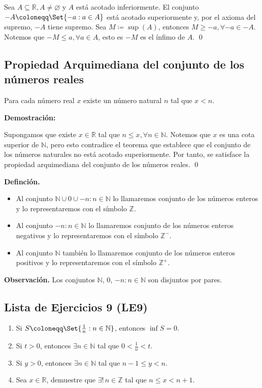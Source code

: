 \documentclass[11pt]{article}
\newcommand{\N}{\mathbb{N}}
\newcommand{\Z}{\mathbb{Z}}
\newcommand{\R}{\mathbb{R}}
\let\emptyset\varnothing
\let\set\Set
\begin{document}
Sea $A\subseteq \R, A\neq \emptyset$ y $A$ está acotado inferiormente. El conjunto $-A \coloneqq \set{-a: a\in A}$ está acotado superiormente y, por el axioma del supremo, $-A$ tiene supremo. Sea $M\coloneqq \sup{(A)}$, entonces $M\geq -a, \forall -a\in -A$. Notemos que $-M\leq a, \forall a\in A$, esto es $-M$ es el ínfimo de $A$. \qed

\subsection*{Propiedad Arquimediana del conjunto de los números reales}

Para cada número real $x$ existe un número natural $n$ tal que $x<n$.

\textbf{Demostración:}

Supongamos que existe $x\in \R$ tal que $n\leq x, \forall n\in \N$. Notemos que $x$ es una cota superior de $\N$, pero esto contradice el teorema que establece que el conjunto de los números naturales no está acotado superiormente. Por tanto, se satisface la propiedad arquimediana del conjunto de los números reales. \qed

\textbf{Definción.} \begin{itemize}
    \item Al conjunto $\N \cup {0} \cup {-n: n\in \N}$ lo llamaremos conjunto de los números enteros y lo representaremos con el símbolo $\Z$.
    \item Al conjunto ${-n: n\in \N}$ lo llamaremos conjunto de los números enteros negativos y lo representaremos con el símbolo $\Z^-$.
    \item Al conjunto $\N$ también lo llamaremos conjunto de los números enteros positivos y lo representaremos con el símbolo $\Z^+$.
\end{itemize}

\textbf{Observación.} Los conjuntos $\N$, ${0}$, ${-n: n\in \N}$ son disjuntos por pares.

\subsection*{Lista de Ejercicios 9 (LE9)}

\begin{enumerate}[label=\alph*)]
    \item Si $S \coloneqq \set{\frac{1}{n}: n\in \N}$, entonces $\inf{S=0}$.
    \item Si $t>0$, entonces $\exists n\in \N$ tal que $0<\frac{1}{n}<t$.
    \item Si $y>0$, entonces $\exists n\in \N$ tal que $n-1\leq y< n$.
    \item Sea $x\in \R$, demuestre que $\exists! \, n\in \Z$ tal que $n\leq x<n+1$.
\end{enumerate}
\end{document}
